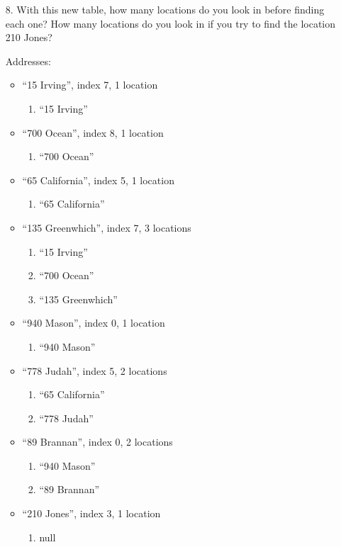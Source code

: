 \documentclass[10pt]{article}
\begin{document}
\begin{enumerate}
		\item[8.] With this new table, how many locations do you look in before finding each one? How many locations do you look in if you try to find the location 210 Jones?
			
			\vspace{0.5cm}
			Addresses:
			\begin{itemize}
				\item ``15 Irving'', index 7, 1 location
					\begin{enumerate}
						\item ``15 Irving''
					\end{enumerate}
					
				\item ``700 Ocean'', index 8, 1 location
					\begin{enumerate}
						\item ``700 Ocean''
					\end{enumerate}
					
				\item ``65 California'', index 5, 1 location
					\begin{enumerate}
						\item ``65 California''
					\end{enumerate}
					
				\item ``135 Greenwhich'', index 7, 3 locations
					\begin{enumerate}
						\item ``15 Irving''
						\item ``700 Ocean''
						\item ``135 Greenwhich''
					\end{enumerate}
					
				\item ``940 Mason'', index 0, 1 location
					\begin{enumerate}
						\item ``940 Mason''
					\end{enumerate}
					
				\item ``778 Judah'', index 5, 2 locations
					\begin{enumerate}
						\item ``65 California''
						\item ``778 Judah''
					\end{enumerate}
					
				\item ``89 Brannan'', index 0, 2 locations
					\begin{enumerate}
						\item ``940 Mason''
						\item ``89 Brannan''
					\end{enumerate}
					
				\item ``210 Jones'', index 3, 1 location
					\begin{enumerate}
						\item null
					\end{enumerate}
			\end{itemize}
	\end{enumerate}
\end{document}

